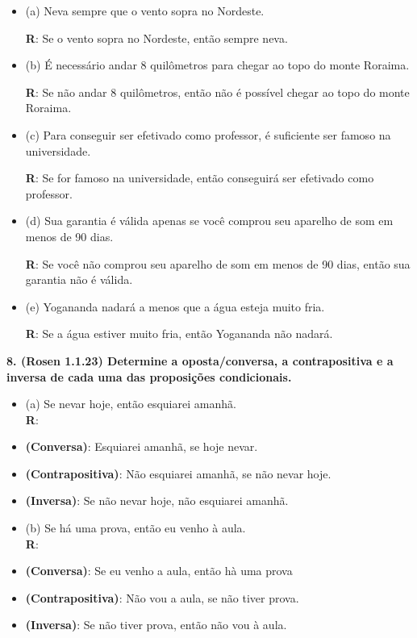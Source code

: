 \documentclass{article}
\begin{document}
\begin{itemize}[label={}]
    \item (a) Neva sempre que o vento sopra no Nordeste. \>
    
    \textbf{R}: Se o vento sopra no Nordeste, então sempre neva.\\

    
    \item (b) É necessário andar 8 quilômetros para chegar ao topo do monte Roraima. \>
    
    \textbf{R}: Se não andar 8 quilômetros, então não é possível chegar ao topo do monte Roraima.\\
    

    \item (c) Para conseguir ser efetivado como professor, é suficiente ser famoso na universidade.\>
     
    \textbf{R}: Se for famoso na universidade, então conseguirá ser efetivado como professor.\\
   
    
    \item (d) Sua garantia é válida apenas se você comprou seu aparelho de som em menos de 90 dias. \>
     
     
    \textbf{R}: Se você não comprou seu aparelho de som em menos de 90 dias, então sua garantia não é válida.\\
   
    
    \item (e) Yogananda nadará a menos que a água esteja muito fria. \>
     
    \textbf{R}: Se a água estiver muito fria, então Yogananda não nadará. \\
    
\end{itemize}

\textbf{8. (Rosen 1.1.23) Determine a oposta/conversa, a contrapositiva e a inversa de cada uma das proposições condicionais.}

\begin{itemize}[label={}]
    
    \item (a) Se nevar hoje, então esquiarei amanhã. \\ 
    \textbf{R}: 
    \item \textbf{(Conversa)}: Esquiarei amanhã, se hoje nevar.
    \item \textbf{(Contrapositiva)}: Não esquiarei amanhã, se não nevar hoje.
    \item \textbf{(Inversa)}: Se não nevar hoje, não esquiarei amanhã.
\\

    \item (b) Se há uma prova, então eu venho à aula. \\
    \textbf{R}: 
    \item \textbf{(Conversa)}: Se eu venho a aula, então hà uma prova
    \item \textbf{(Contrapositiva)}: Não vou a aula, se não tiver prova.
    \item \textbf{(Inversa)}: Se não tiver prova, então não vou à aula.
\\
\end{itemize}
\end{document}

